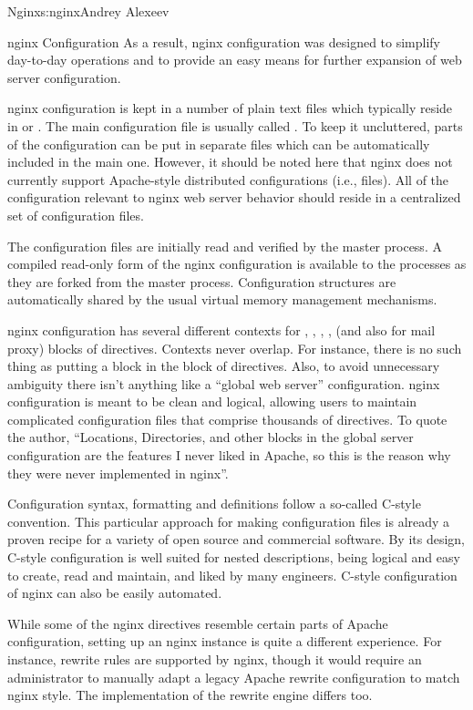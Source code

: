 \begin{aosachapter}{Nginx}{s:nginx}{Andrey Alexeev}
\begin{aosasect1}{nginx Configuration}
As a result, nginx configuration was designed to simplify day-to-day
operations and to provide an easy means for further expansion of web
server configuration.

nginx configuration is kept in a number of plain text files which
typically reside in  or
. The main configuration file is usually called
. To keep it uncluttered, parts of the configuration
can be put in separate files which can be automatically included in
the main one. However, it should be noted here that nginx does not
currently support Apache-style distributed configurations (i.e.,
 files). All of the configuration relevant to nginx
web server behavior should reside in a centralized set of
configuration files.

The configuration files are initially read and verified by the master
process. A compiled read-only form of the nginx configuration is
available to the  processes as they are forked from the
master process. Configuration structures are automatically shared by
the usual virtual memory management mechanisms.

nginx configuration has several different contexts for ,
, , ,  (and also
 for mail proxy) blocks of directives. Contexts never
overlap. For instance, there is no such thing as putting a
 block in the  block of directives. Also, to
avoid unnecessary ambiguity there isn't anything like a ``global web
server'' configuration. nginx configuration is meant to be clean and
logical, allowing users to maintain complicated configuration files
that comprise thousands of directives. To quote the author,
``Locations, Directories, and other blocks in the global server
configuration are the features I never liked in Apache, so this is the
reason why they were never implemented in nginx''.

Configuration syntax, formatting and definitions follow a so-called
C-style convention. This particular approach for making configuration
files is already a proven recipe for a variety of open source and
commercial software. By its design, C-style configuration is well
suited for nested descriptions, being logical and easy to create, read
and maintain, and liked by many engineers. C-style configuration of
nginx can also be easily automated.

While some of the nginx directives resemble certain parts of Apache
configuration, setting up an nginx instance is quite a different
experience. For instance, rewrite rules are supported by nginx, though
it would require an administrator to manually adapt a legacy Apache
rewrite configuration to match nginx style. The implementation of the
rewrite engine differs too.


\end{aosasect1}
\end{aosachapter}
